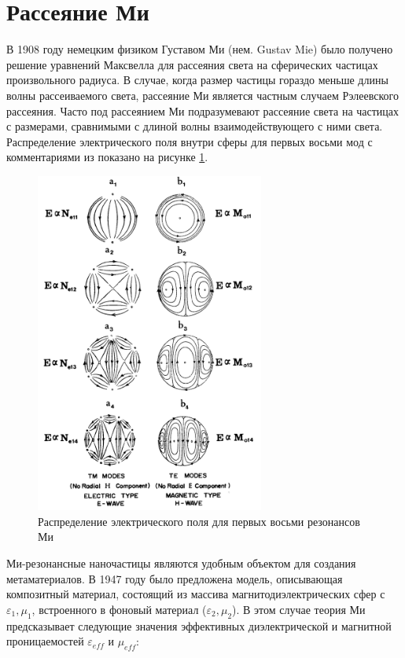 \section{Рассеяние Ми}

В 1908 году немецким физиком Густавом Ми (нем. Gustav Mie) было получено \cite{Mie1908} решение уравнений Максвелла для рассеяния света на сферических частицах произвольного радиуса. В случае, когда размер частицы гораздо меньше длины волны рассеиваемого света, рассеяние Ми является частным случаем Рэлеевского рассеяния. Часто под рассеянием Ми подразумевают рассеяние света на частицах с размерами, сравнимыми с длиной волны взаимодействующего с ними света. Распределение электрического поля внутри сферы для первых восьми мод с комментариями из \cite{Bohren1998} показано на рисунке \ref{fig:mie_example}.

\begin{figure}[H]
	\centering
	\includegraphics[width=0.67\textwidth]{img/Mie_total}
	\caption{Распределение электрического поля для первых восьми резонансов Ми}
	\label{fig:mie_example}
\end{figure}

Ми-резонансные наночастицы являются удобным объектом для создания метаматериалов. В 1947 году было предложена \cite{Lewin1947} модель, описывающая композитный материал, состоящий из массива магнитодиэлектрических сфер с $\varepsilon_1, \mu_1$, встроенного в фоновый материал ($\varepsilon_2, \mu_2$). В этом случае теория Ми предсказывает следующие значения эффективных диэлектрической и магнитной проницаемостей $\varepsilon_{eff}$ и $\mu_{eff}$:

